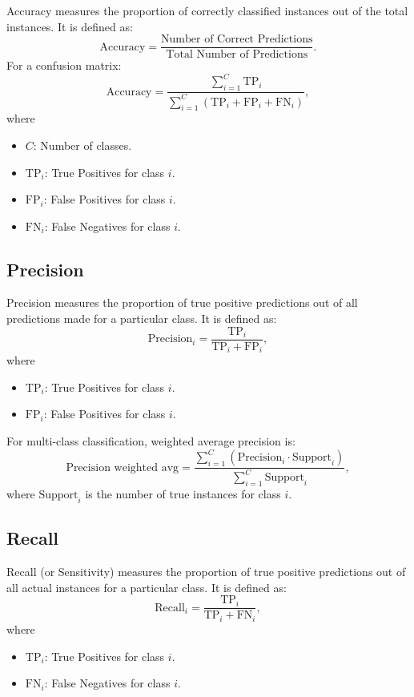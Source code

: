\documentclass[a4paper,12pt]{article}
\begin{document}
Accuracy measures the proportion of correctly classified instances out of the total instances. It is defined as:
$$
\text{Accuracy} = \frac{\text{Number of Correct Predictions}}{\text{Total Number of Predictions}}.
$$
For a confusion matrix:
$$
\text{Accuracy} = \frac{\sum_{i=1}^C \text{TP}_i}{\sum_{i=1}^C (\text{TP}_i + \text{FP}_i + \text{FN}_i)},
$$
where
\begin{itemize}
	\item $C$: Number of classes.
	\item $\text{TP}_i$: True Positives for class $i$.
	\item $\text{FP}_i$: False Positives for class $i$.
	\item $\text{FN}_i$: False Negatives for class $i$.
\end{itemize}


\subsection{Precision}

Precision measures the proportion of true positive predictions out of all predictions made for a particular class. It is defined as:
$$
\text{Precision}_i = \frac{\text{TP}_i}{\text{TP}_i + \text{FP}_i},
$$
where
\begin{itemize}
	\item $\text{TP}_i$: True Positives for class $i$.
	\item $\text{FP}_i$: False Positives for class $i$.
\end{itemize}

For multi-class classification, weighted average precision is:
$$
\text{Precision weighted avg} = \frac{\sum_{i=1}^C (\text{Precision}_i \cdot \text{Support}_i)}{\sum_{i=1}^C \text{Support}_i},
$$
where $\text{Support}_i$ is the number of true instances for class $i$.

\subsection{Recall}

Recall (or Sensitivity) measures the proportion of true positive predictions out of all actual instances for a particular class. It is defined as:
$$
\text{Recall}_i = \frac{\text{TP}_i}{\text{TP}_i + \text{FN}_i},
$$
where
\begin{itemize}
	\item $\text{TP}_i$: True Positives for class $i$.
	\item $\text{FN}_i$: False Negatives for class $i$.
\end{itemize}
\end{document}
